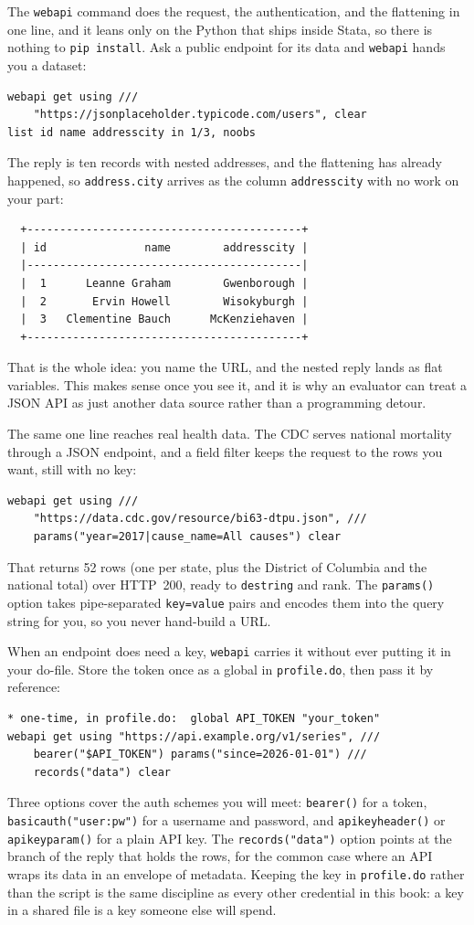\documentclass[
    a4paper,
    fontsize=10pt,
    twoside=true,
    numbers=noenddot,
]{kaobook}
\begin{document}
The \texttt{webapi} command does the request, the authentication, and the flattening in one line, and it leans only on the Python that ships inside Stata, so there is nothing to \texttt{pip install}. Ask a public endpoint for its data and \texttt{webapi} hands you a dataset:
{\footnotesize
\begin{verbatim}
webapi get using ///
    "https://jsonplaceholder.typicode.com/users", clear
list id name addresscity in 1/3, noobs
\end{verbatim}
}
The reply is ten records with nested addresses, and the flattening has already happened, so \texttt{address.city} arrives as the column \texttt{addresscity} with no work on your part:
{\footnotesize
\begin{verbatim}
  +------------------------------------------+
  | id               name        addresscity |
  |------------------------------------------|
  |  1      Leanne Graham        Gwenborough |
  |  2       Ervin Howell        Wisokyburgh |
  |  3   Clementine Bauch      McKenziehaven |
  +------------------------------------------+
\end{verbatim}
}
That is the whole idea: you name the URL, and the nested reply lands as flat variables. This makes sense once you see it, and it is why an evaluator can treat a JSON API as just another data source rather than a programming detour.

The same one line reaches real health data. The CDC serves national mortality through a JSON endpoint, and a field filter keeps the request to the rows you want, still with no key:
{\footnotesize
\begin{verbatim}
webapi get using ///
    "https://data.cdc.gov/resource/bi63-dtpu.json", ///
    params("year=2017|cause_name=All causes") clear
\end{verbatim}
}
That returns 52 rows (one per state, plus the District of Columbia and the national total) over HTTP~200, ready to \texttt{destring} and rank. The \texttt{params()} option takes pipe-separated \texttt{key=value} pairs and encodes them into the query string for you, so you never hand-build a URL.

When an endpoint does need a key, \texttt{webapi} carries it without ever putting it in your do-file. Store the token once as a global in \texttt{profile.do}, then pass it by reference:
{\footnotesize
\begin{verbatim}
* one-time, in profile.do:  global API_TOKEN "your_token"
webapi get using "https://api.example.org/v1/series", ///
    bearer("$API_TOKEN") params("since=2026-01-01") ///
    records("data") clear
\end{verbatim}
}
Three options cover the auth schemes you will meet: \texttt{bearer()} for a token, \texttt{basicauth("user:pw")} for a username and password, and \texttt{apikeyheader()} or \texttt{apikeyparam()} for a plain API key. The \texttt{records("data")} option points at the branch of the reply that holds the rows, for the common case where an API wraps its data in an envelope of metadata. Keeping the key in \texttt{profile.do} rather than the script is the same discipline as every other credential in this book: a key in a shared file is a key someone else will spend.
\end{document}
